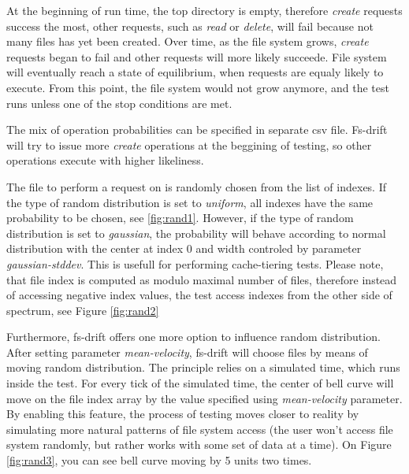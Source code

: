 \documentclass[
  color, %
  table, %
  lof,   %
  lot,   %
]{fithesis3}
\begin{document}
At the beginning of run time, the top directory is empty, therefore \textit{create} requests success the most, other requests, such as \textit{read} or \textit{delete}, will fail because not many files has yet been created. Over time, as the file system grows, \textit{create} requests began to fail and other requests will more likely succeede. File system will eventually reach a state of equilibrium, when requests are equaly likely to execute. From this point, the file system would not grow anymore, and the test runs unless one of the stop conditions are met.

The mix of operation probabilities can be specified in separate csv file. Fs-drift will try to issue more \textit{create} operations at the beggining of testing, so other operations execute with higher likeliness.

The file to perform a request on is randomly chosen from the list of indexes. If the type of random distribution is set to \textit{uniform}, all indexes have the same probability to be chosen, see \ref{fig:rand1}. However, if the type of random distribution is set to \textit{gaussian}, the probability will behave according to normal distribution with the center at index 0 and width controled by parameter \textit{gaussian-stddev}. This is usefull for performing cache-tiering tests. Please note, that file index is computed as modulo maximal number of files, therefore instead of accessing negative index values, the test access indexes from the other side of spectrum, see Figure \ref{fig:rand2}

Furthermore, fs-drift offers one more option to influence random distribution. After setting parameter \textit{mean-velocity}, fs-drift will choose files by means of moving random distribution. The principle relies on a simulated time, which runs inside the test. For every tick of the simulated time, the center of bell curve will move on the file index array by the value specified using \textit{mean-velocity} parameter. By enabling this feature, the process of testing moves closer to reality by simulating more natural patterns of file system access (the user won't access file system randomly, but rather works with some set of data at a time). On Figure \ref{fig:rand3}, you can see bell curve moving by 5 units two times.
\end{document}
